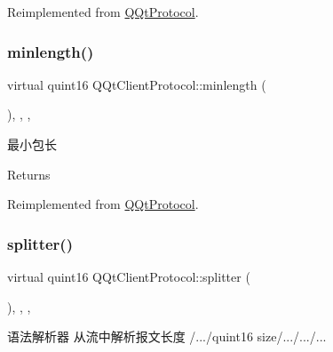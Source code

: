 Reimplemented from \mbox{\hyperlink{class_q_qt_protocol_af41bc3116abbbcfc9af45e151a253ff7}{Q\+Qt\+Protocol}}.

\mbox{\label{class_q_qt_client_protocol_ad6e417b3d0494dc0cd29606d39c54e09}} 
\subsubsection{\texorpdfstring{minlength()}{minlength()}}
{\footnotesize\ttfamily virtual quint16 Q\+Qt\+Client\+Protocol\+::minlength (\begin{DoxyParamCaption}{ }\end{DoxyParamCaption})\hspace{0.3cm}{\ttfamily [inline]}, {\ttfamily [override]}, {\ttfamily [protected]}, {\ttfamily [virtual]}}



最小包长 

\begin{DoxyReturn}{Returns}

\end{DoxyReturn}


Reimplemented from \mbox{\hyperlink{class_q_qt_protocol_a2b00f53d3dd0eed817eeecff422891f3}{Q\+Qt\+Protocol}}.

\mbox{\label{class_q_qt_client_protocol_a47ee18513a0294465dcb584d84288b5d}} 
\subsubsection{\texorpdfstring{splitter()}{splitter()}}
{\footnotesize\ttfamily virtual quint16 Q\+Qt\+Client\+Protocol\+::splitter (\begin{DoxyParamCaption}\item[{const Q\+Byte\+Array \&}]{ }\end{DoxyParamCaption})\hspace{0.3cm}{\ttfamily [inline]}, {\ttfamily [override]}, {\ttfamily [protected]}, {\ttfamily [virtual]}}



语法解析器 从流中解析报文长度 /.../quint16 size/.../.../... 


